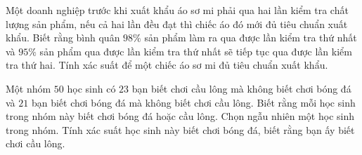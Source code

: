 \begin{bt}
	Một doanh nghiệp trước khi xuất khẩu áo sơ mi phải qua hai lần kiểm tra chất lượng sản phẩm, nếu cả hai lần đều đạt thì chiếc áo đó mới đủ tiêu chuẩn xuất khẩu. Biết rằng bình quân $98\%$ sản phẩm làm ra qua được lần kiểm tra thứ nhất và $95\%$ sản phẩm qua được lần kiểm tra thứ nhất sẽ tiếp tục qua được lần kiểm tra thứ hai. Tính xác suất để một chiếc áo sơ mi đủ tiêu chuẩn xuất khẩu.
\end{bt}
\begin{bt}
	Một nhóm $50$ học sinh có $23$ bạn biết chơi cầu lông mà không biết chơi bóng đá và $21$ bạn biết chơi bóng đá mà không biết chơi cầu lông. Biết rằng mỗi học sinh trong nhóm này biết chơi bóng đá hoặc cầu lông. Chọn ngẫu nhiên một học sinh trong nhóm. Tính xác suất học sinh này biết chơi bóng đá, biết rằng bạn ấy biết chơi cầu lông. 
\end{bt}

